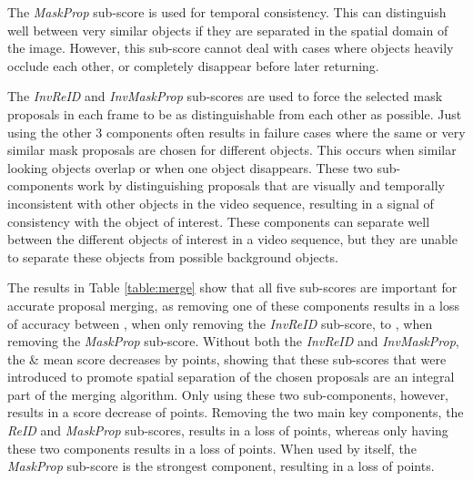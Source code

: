 \documentclass[runningheads]{llncs}
\begin{document}
The \textit{MaskProp} sub-score is used for temporal consistency. This can distinguish well between very similar objects if they are separated in the spatial domain of the image. However, this sub-score cannot deal with cases where objects heavily occlude each other, or completely disappear before later returning.

The \textit{InvReID} and \textit{InvMaskProp} sub-scores are used to force the selected mask proposals in each frame to be as distinguishable from each other as possible. Just using the other 3 components often results in failure cases where the same or very similar mask proposals are chosen for different objects. This occurs when similar looking objects overlap or when one object disappears. These two sub-components work by distinguishing proposals that are visually and temporally inconsistent with other objects in the video sequence, resulting in a signal of consistency with the object of interest. These components can separate well between the different objects of interest in a video sequence, but they are unable to separate these objects from possible background objects.

The results in Table \ref{table:merge} show that all five sub-scores are important for accurate proposal merging, as removing one of these components results in a loss of accuracy between , when only removing the \textit{InvReID} sub-score, to , when removing the \textit{MaskProp} sub-score. Without both the \textit{InvReID} and \textit{InvMaskProp}, the \& mean score decreases by  points, showing that these sub-scores that were introduced to promote spatial separation of the chosen proposals are an integral part of the merging algorithm. Only using these two sub-components, however, results in a score decrease of  points. Removing the two main key components, the \textit{ReID} and \textit{MaskProp} sub-scores, results in a loss of  points, whereas only having these two components results in a loss of  points. When used by itself, the \textit{MaskProp} sub-score is the strongest component, resulting in a loss of  points.
\end{document}
